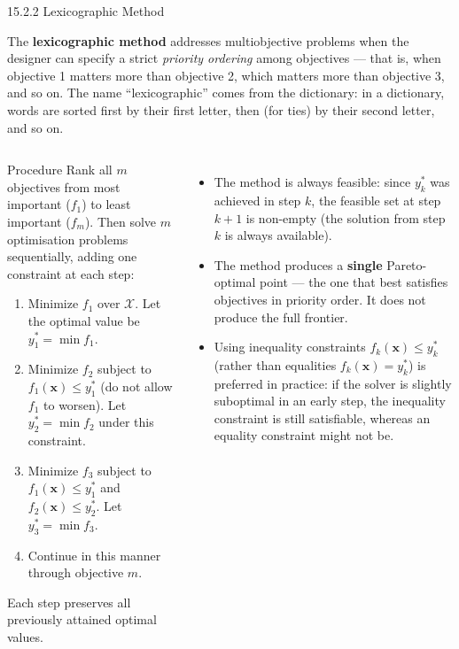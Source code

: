 \documentclass[aspectratio=169,10pt]{beamer}
\newcommand{\bx}{\mathbf{x}}
\begin{document}
\begin{frame}[allowframebreaks]{15.2.2 Lexicographic Method}

The \textbf{lexicographic method} addresses multiobjective problems when the
designer can specify a strict \emph{priority ordering} among objectives ---
that is, when objective 1 matters more than objective 2, which matters more
than objective 3, and so on.  The name ``lexicographic'' comes from the
dictionary: in a dictionary, words are sorted first by their first letter,
then (for ties) by their second letter, and so on.

\begin{columns}
\begin{block}{Procedure}
  Rank all $m$ objectives from most important ($f_1$) to least important
  ($f_m$).  Then solve $m$ optimisation problems sequentially, adding one
  constraint at each step:
  \begin{enumerate}
    \item Minimize $f_1$ over $\mathcal{X}$.  Let the optimal value be
      $y_1^* = \min f_1$.
    \item Minimize $f_2$ subject to $f_1(\bx) \le y_1^*$ (do not allow
      $f_1$ to worsen).  Let $y_2^* = \min f_2$ under this constraint.
    \item Minimize $f_3$ subject to $f_1(\bx) \le y_1^*$ and
      $f_2(\bx) \le y_2^*$.  Let $y_3^* = \min f_3$.
    \item Continue in this manner through objective $m$.
  \end{enumerate}
  Each step preserves all previously attained optimal values.
\end{block}

\begin{itemize}
  \item The method is always feasible: since $y_k^*$ was achieved in step $k$,
    the feasible set at step $k+1$ is non-empty (the solution from step $k$
    is always available).

  \item The method produces a \textbf{single} Pareto-optimal point --- the one
    that best satisfies objectives in priority order.  It does not produce the
    full frontier.

  \item Using inequality constraints $f_k(\bx) \le y_k^*$ (rather than
    equalities $f_k(\bx) = y_k^*$) is preferred in practice: if the solver is
    slightly suboptimal in an early step, the inequality constraint is still
    satisfiable, whereas an equality constraint might not be.
\end{itemize}


\end{columns}
\end{frame}
\end{document}
